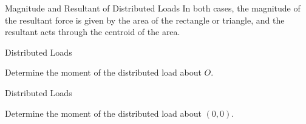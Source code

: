 \documentclass[9pt, xcolor={svgnames, x11names},professionalfonts]{beamer}
\def\scale{1}
\begin{document}

\begin{frame}{Magnitude and Resultant of Distributed Loads}
	In both cases, the magnitude of the resultant force is given by the area of the rectangle or triangle, and the resultant acts through the centroid of the area.\parb
	\hfill

\end{frame}


\begin{frame}{Distributed Loads}
	\begin{myexam}{}{}
		\centering
		
		\parm
		Determine the moment of the distributed load about  $O$.
		\parm
	\end{myexam}
	\centering

\end{frame}


\begin{frame}{Distributed Loads}

	\begin{myexer}{}{}
		\centering\def\scale{1.25}
		
		\parm
		Determine the moment of the distributed load about  $(0,0)$.
		\parm
	\end{myexer}
\end{frame}

\end{document}
